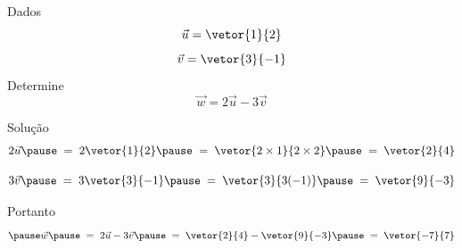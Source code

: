\begin{question}
  Dados
  \[
    \vec{u} = \vetor{1}{2}
  \]
  \[
    \vec{v} = \vetor{3}{-1}
  \]
  Determine
  \[
    \vec{w} = 2\vec{u} - 3\vec{v}
  \]
\end{question}

\begin{resolution}{Solução}
  \[
    2\vec{u}
    \pause
    \;=\; 2\vetor{1}{2}
    \pause
    \;=\; \vetor{2\times 1}{2\times 2}
    \pause
    \;=\; \vetor{2}{4}
  \]

  \pause
  \[
    3\vec{v}
    \pause
    \;=\; 3\vetor{3}{-1}
    \pause
    \;=\; \vetor{3\time 3}{3(-1)}
    \pause
    \;=\; \vetor{9}{-3}
  \]

  \pause
  Portanto
  \[
    \pause
    \vec{w}
    \pause
    \;=\; 2\vec{u} - 3\vec{v}
    \pause
    \;=\; \vetor{2}{4} - \vetor{9}{-3}
    \pause
    \;=\; \vetor{-7}{7}
  \]
\end{resolution}

\endinput

